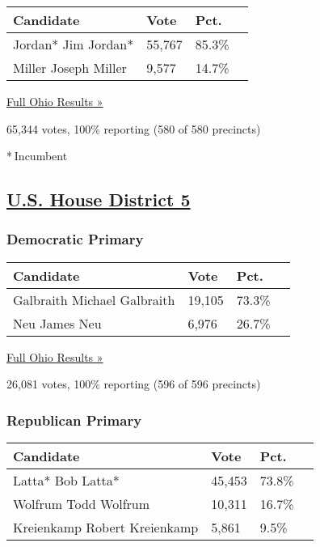 \begin{longtable}[]{@{}llll@{}}
\toprule
Candidate & Vote & Pct. &\tabularnewline
\midrule
\endhead
 Jordan* Jim Jordan* & 55,767 & 85.3\% &\tabularnewline
 Miller Joseph Miller & 9,577 & 14.7\% &\tabularnewline
\bottomrule
\end{longtable}

\href{https://www.nytimes3xbfgragh.onion/elections/results/ohio}{Full
Ohio Results »}

65,344 votes, 100\% reporting (580 of 580 precincts)

* Incumbent

\hypertarget{us-house-district-5}{%
\subsection{\texorpdfstring{\href{https://www.nytimes3xbfgragh.onion/elections/results/ohio-house-district-5-primary-election}{U.S.
House District 5}}{U.S. House District 5}}\label{us-house-district-5}}

\hypertarget{democratic-primary-6}{%
\subsubsection{Democratic Primary}\label{democratic-primary-6}}

\begin{longtable}[]{@{}llll@{}}
\toprule
Candidate & Vote & Pct. &\tabularnewline
\midrule
\endhead
 Galbraith Michael Galbraith & 19,105 & 73.3\% &\tabularnewline
 Neu James Neu & 6,976 & 26.7\% &\tabularnewline
\bottomrule
\end{longtable}

\href{https://www.nytimes3xbfgragh.onion/elections/results/ohio}{Full
Ohio Results »}

26,081 votes, 100\% reporting (596 of 596 precincts)

\hypertarget{republican-primary-6}{%
\subsubsection{Republican Primary}\label{republican-primary-6}}

\begin{longtable}[]{@{}llll@{}}
\toprule
Candidate & Vote & Pct. &\tabularnewline
\midrule
\endhead
 Latta* Bob Latta* & 45,453 & 73.8\% &\tabularnewline
 Wolfrum Todd Wolfrum & 10,311 & 16.7\% &\tabularnewline
 Kreienkamp Robert Kreienkamp & 5,861 & 9.5\% &\tabularnewline
\bottomrule
\end{longtable}

